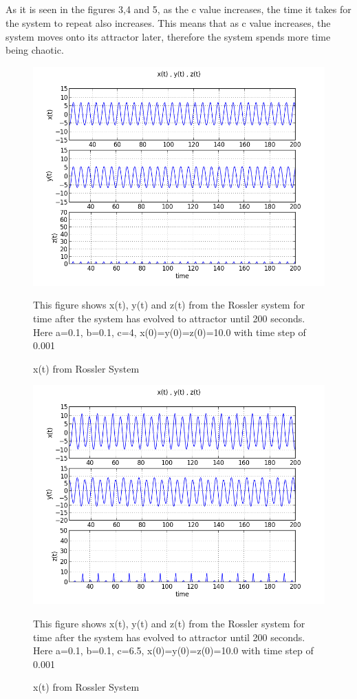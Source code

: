 \documentclass[letterpaper,12pt]{article}
\begin{document}
\subsection{}
As it is seen in the figures 3,4 and 5,  as the c value increases, the time it takes for the system to repeat also increases. This means that as c value increases, the system moves onto its attractor later, therefore the system spends more time being chaotic.
\FloatBarrier
\begin{figure}[h!]
\centering
\includegraphics[scale=0.7]{1_c_4.png}
\caption{x(t) from Rossler System}
This figure shows x(t), y(t) and z(t) from the Rossler system for time after the system has evolved to attractor until 200 seconds. Here a=0.1, b=0.1, c=4, x(0)=y(0)=z(0)=10.0 with time step of 0.001
\end{figure}
\FloatBarrier

\FloatBarrier
\begin{figure}[h!]
\centering
\includegraphics[scale=0.7]{1_c_6.png}
\caption{x(t) from Rossler System}
This figure shows x(t), y(t) and z(t) from the Rossler system for time after the system has evolved to attractor until 200 seconds. Here a=0.1, b=0.1, c=6.5, x(0)=y(0)=z(0)=10.0 with time step of 0.001

\end{figure}
\FloatBarrier
\end{document}

